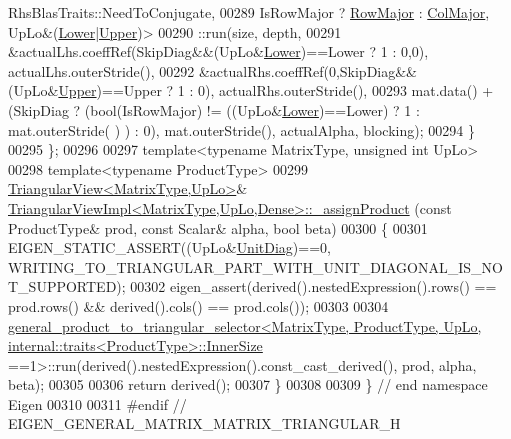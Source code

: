 \begin{DoxyCode}
      RhsBlasTraits::NeedToConjugate,
00289       IsRowMajor ? \hyperlink{group__enums_ggaacded1a18ae58b0f554751f6cdf9eb13acfcde9cd8677c5f7caf6bd603666aae3}{RowMajor} : \hyperlink{group__enums_ggaacded1a18ae58b0f554751f6cdf9eb13a0cbd4bdd0abcfc0224c5fcb5e4f6669a}{ColMajor}, UpLo&(\hyperlink{group__enums_gga39e3366ff5554d731e7dc8bb642f83cda891792b8ed394f7607ab16dd716f60e6}{Lower}|\hyperlink{group__enums_gga39e3366ff5554d731e7dc8bb642f83cda6bcb58be3b8b8ec84859ce0c5ac0aaec}{Upper})>
00290       ::run(size, depth,
00291             &actualLhs.coeffRef(SkipDiag&&(UpLo&\hyperlink{group__enums_gga39e3366ff5554d731e7dc8bb642f83cda891792b8ed394f7607ab16dd716f60e6}{Lower})==Lower ? 1 : 0,0), actualLhs.outerStride(),
00292             &actualRhs.coeffRef(0,SkipDiag&&(UpLo&\hyperlink{group__enums_gga39e3366ff5554d731e7dc8bb642f83cda6bcb58be3b8b8ec84859ce0c5ac0aaec}{Upper})==Upper ? 1 : 0), actualRhs.outerStride(),
00293             mat.data() + (SkipDiag ? (bool(IsRowMajor) != ((UpLo&\hyperlink{group__enums_gga39e3366ff5554d731e7dc8bb642f83cda891792b8ed394f7607ab16dd716f60e6}{Lower})==Lower) ? 1 : mat.outerStride(
      ) ) : 0), mat.outerStride(), actualAlpha, blocking);
00294   \}
00295 \};
00296 
00297 \textcolor{keyword}{template}<\textcolor{keyword}{typename} MatrixType, \textcolor{keywordtype}{unsigned} \textcolor{keywordtype}{int} UpLo>
00298 \textcolor{keyword}{template}<\textcolor{keyword}{typename} ProductType>
00299 \hyperlink{group___core___module_class_eigen_1_1_triangular_view}{TriangularView<MatrixType,UpLo>}& 
      \hyperlink{class_eigen_1_1_triangular_view_impl}{TriangularViewImpl<MatrixType,UpLo,Dense>::\_assignProduct}
      (\textcolor{keyword}{const} ProductType& prod, \textcolor{keyword}{const} Scalar& alpha, \textcolor{keywordtype}{bool} beta)
00300 \{
00301   EIGEN\_STATIC\_ASSERT((UpLo&\hyperlink{group__enums_gga39e3366ff5554d731e7dc8bb642f83cdaddb72f888ac85d5a1c52333e54f9374b}{UnitDiag})==0, 
      WRITING\_TO\_TRIANGULAR\_PART\_WITH\_UNIT\_DIAGONAL\_IS\_NOT\_SUPPORTED);
00302   eigen\_assert(derived().nestedExpression().rows() == prod.rows() && derived().cols() == prod.cols());
00303   
00304   
      \hyperlink{struct_eigen_1_1general__product__to__triangular__selector}{general\_product\_to\_triangular\_selector<MatrixType, ProductType, UpLo,
       internal::traits<ProductType>::InnerSize}
      ==1>::run(derived().nestedExpression().const\_cast\_derived(), prod, alpha, beta);
00305   
00306   \textcolor{keywordflow}{return} derived();
00307 \}
00308 
00309 \} \textcolor{comment}{// end namespace Eigen}
00310 
00311 \textcolor{preprocessor}{#endif // EIGEN\_GENERAL\_MATRIX\_MATRIX\_TRIANGULAR\_H}
\end{DoxyCode}
